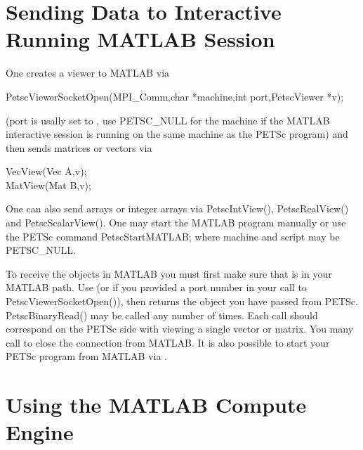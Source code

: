 \section{Sending Data to Interactive Running MATLAB Session}

One creates a viewer to MATLAB via
\begin{tabbing}
PetscViewerSocketOpen(MPI\_Comm,char *machine,int port,PetscViewer *v);
\end{tabbing}
(port is usally set to , use PETSC\_NULL for the machine if the
MATLAB interactive session is running on the same machine as the PETSc program)
and then sends matrices or vectors via
\begin{tabbing}
  VecView(Vec A,v);\\
  MatView(Mat B,v);
\end{tabbing}
One can also send arrays or integer arrays via PetscIntView(), PetscRealView() and PetscScalarView().
One may start the MATLAB program manually or use the PETSc command
PetscStartMATLAB; where machine and script may be PETSC\_NULL.

To receive the objects in MATLAB you must first make sure that 
is in your MATLAB path. Use  (or  if you provided a port number in
your call to PetscViewerSocketOpen()), then  returns the object you have passed from PETSc.
PetscBinaryRead() may be called any number of times. Each call should correspond on the PETSc side with
viewing a single vector or matrix. You many call  to close the connection from MATLAB.
It is also possible to start your PETSc program from MATLAB via .

\section{Using the MATLAB Compute Engine}

